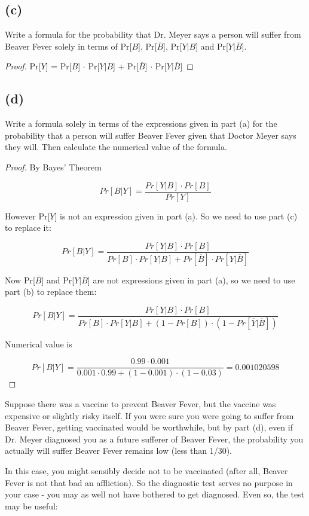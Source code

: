 \documentclass[14pt]{extarticle}
\begin{document}
\subsection{(c)}
Write a formula for the probability that Dr. Meyer says a person will suffer from Beaver Fever solely in terms of Pr[$B$], Pr[$\overline{B}$], Pr[$Y | B$] and Pr[$Y | \overline{B}$].
\begin{proof}
Pr[$Y$] = Pr[$B$] $\cdot$ Pr[$Y|B$] + Pr[$\overline{B}$] $\cdot$ Pr[$Y|\overline{B}$]
\end{proof}

\subsection{(d)}
Write a formula solely in terms of the expressions given in part (a) for the probability that a person will suffer Beaver Fever given that Doctor Meyer says they will. Then calculate the numerical value of the formula.
\begin{proof}
By Bayes' Theorem

$$
Pr[B|Y] = \frac{Pr[Y|B]\cdot Pr[B]}{Pr[Y]}
$$

However Pr[$Y$] is not an expression given in part (a). So we need to use part (c) to replace it:

$$
Pr[B|Y] = \frac{Pr[Y|B]\cdot Pr[B]}{Pr[B] \cdot Pr[Y|B] + Pr[\overline{B}] \cdot Pr[Y|\overline{B}]}
$$

Now Pr[$\overline{B}$] and Pr[$Y|\overline{B}$] are not expressions given in part (a), so we need to use part (b) to replace them:

$$
Pr[B|Y] = \frac{Pr[Y|B]\cdot Pr[B]}{Pr[B] \cdot Pr[Y|B] + (1-Pr[B]) \cdot (1- Pr[\overline{Y}|\overline{B}])}
$$

Numerical value is

$$
Pr[B|Y] = \frac{0.99\cdot 0.001}{0.001 \cdot 0.99 + (1-0.001) \cdot (1- 0.03)} = 0.001020598
$$
\end{proof}

Suppose there was a vaccine to prevent Beaver Fever, but the vaccine was expensive or slightly risky itself. If you were sure you were going to suffer from Beaver Fever, getting vaccinated would be worthwhile, but by part (d), even if Dr. Meyer diagnosed you as a future sufferer of Beaver Fever, the probability you actually
will suffer Beaver Fever remains low (less than 1/30).

In this case, you might sensibly decide not to be vaccinated (after all, Beaver Fever is not that bad an affliction). So the diagnostic test serves no purpose in your case - you may as well not have bothered to get diagnosed. Even so, the test may be useful:
\end{document}
